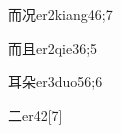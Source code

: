 \begin{verbete}{而况}{er2kiang4}{6;7}
\end{verbete}

\begin{verbete}{而且}{er2qie3}{6;5}
\end{verbete}

\begin{verbete}{耳朵}{er3duo5}{6;6}
\end{verbete}

\begin{verbete}{二}{er4}{2}[7]
\end{verbete}

